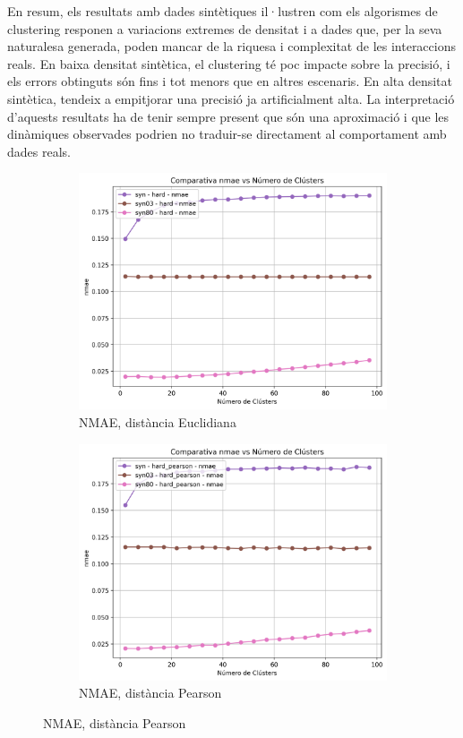 \documentclass[a4paper,12pt]{report}
\begin{document}
En resum, els resultats amb dades sintètiques il·lustren com els algorismes de clustering responen a variacions extremes de densitat i a dades que, per la seva naturalesa generada, poden mancar de la riquesa i complexitat de les interaccions reals. En baixa densitat sintètica, el clustering té poc impacte sobre la precisió, i els errors obtinguts són fins i tot menors que en altres escenaris. En alta densitat sintètica, tendeix a empitjorar una precisió ja artificialment alta. La interpretació d'aquests resultats ha de tenir sempre present que són una aproximació i que les dinàmiques observades podrien no traduir-se directament al comportament amb dades reals.

\begin{figure}[H]
    \centering
    \begin{subfigure}[b]{0.49\textwidth}
        \includegraphics[width=\textwidth]{Figuras/nmae-hard-sin.png}
        \caption{NMAE, distància Euclidiana}
        \label{fig:hard-clustering-sin-results-a}
    \end{subfigure}
    \hfill
    \begin{subfigure}[b]{0.49\textwidth}
        \includegraphics[width=\textwidth]{Figuras/nmae-hard_pearson-sin.png}
        \caption{NMAE, distància Pearson}
        \label{fig:hard-clustering-sin-results-b}
    \end{subfigure}


\end{figure}
\end{document}
